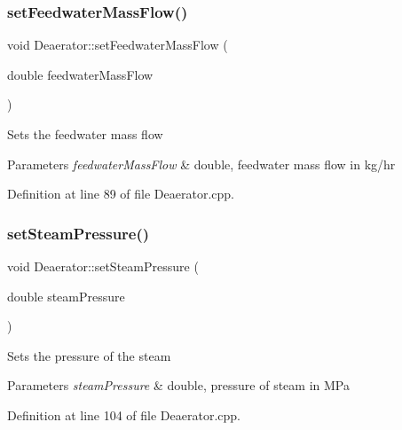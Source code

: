 \mbox{\label{class_deaerator_ada95cb2557bc43602d7bcefbad66c853}} 
\subsubsection{\texorpdfstring{set\+Feedwater\+Mass\+Flow()}{setFeedwaterMassFlow()}}
{\footnotesize\ttfamily void Deaerator\+::set\+Feedwater\+Mass\+Flow (\begin{DoxyParamCaption}\item[{double}]{feedwater\+Mass\+Flow }\end{DoxyParamCaption})}

Sets the feedwater mass flow 
\begin{DoxyParams}{Parameters}
{\em feedwater\+Mass\+Flow} & double, feedwater mass flow in kg/hr \\
\hline
\end{DoxyParams}


Definition at line 89 of file Deaerator.\+cpp.

\mbox{\label{class_deaerator_a5936221e68b5ba3245f0adabed74e6d7}} 
\subsubsection{\texorpdfstring{set\+Steam\+Pressure()}{setSteamPressure()}}
{\footnotesize\ttfamily void Deaerator\+::set\+Steam\+Pressure (\begin{DoxyParamCaption}\item[{double}]{steam\+Pressure }\end{DoxyParamCaption})}

Sets the pressure of the steam 
\begin{DoxyParams}{Parameters}
{\em steam\+Pressure} & double, pressure of steam in M\+Pa \\
\hline
\end{DoxyParams}


Definition at line 104 of file Deaerator.\+cpp.

\mbox{\label{class_deaerator_a1aa3b3de064d148479af9576e717b6c2}} 
